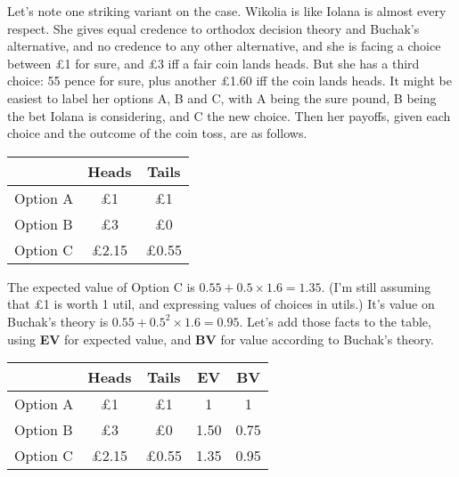 Let's note one striking variant on the case. \gls{Wikolia} is like \gls{Iolana} is almost every respect. She gives equal credence to orthodox decision theory and Buchak's alternative, and no credence to any other alternative, and she is facing a choice between £1 for sure, and £3 iff a fair coin lands heads. But she has a third choice: 55 pence for sure, plus another £1.60 iff the coin lands heads. It might be easiest to label her options A, B and C, with A being the sure pound, B being the bet \gls{Iolana} is considering, and C the new choice. Then her payoffs, given each choice and the outcome of the coin toss, are as follows.

\begin{table}[htbp]
\begin{minipage}{\linewidth}
\setlength{\tymax}{0.5\linewidth}
\centering
\small
\begin{tabulary}{\textwidth}{@{}lcc@{}} \toprule
 & Heads & Tails \\
\midrule

 Option A & £1 & £1 \\
 Option B & £3 & £0 \\
 Option C & £2.15 & £0.55 \\
\bottomrule

\end{tabulary}
\end{minipage}
\end{table}

The expected value of Option C is $0.55 + 0.5 \times 1.6 = 1.35$. (I'm still assuming that £1 is worth 1 util, and expressing values of choices in utils.) It's value on Buchak's theory is $0.55 + 0.5^2 \times 1.6 = 0.95$. Let's add those facts to the table, using \textbf{EV} for expected value, and \textbf{BV} for value according to Buchak's theory.

\begin{table}[htbp]
\begin{minipage}{\linewidth}
\setlength{\tymax}{0.5\linewidth}
\centering
\small
\begin{tabulary}{\textwidth}{@{}lcccc@{}} \toprule
 & Heads & Tails & EV & BV \\
\midrule

 Option A & £1 & £1 & 1 & 1 \\
 Option B & £3 & £0 & 1.50 & 0.75 \\
 Option C & £2.15 & £0.55 & 1.35 & 0.95 \\
\bottomrule

\end{tabulary}
\end{minipage}
\end{table}

